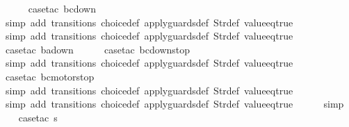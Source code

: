 \begin{isabellebody}
\ \ \ \ \isamarkupfalse%
\ {\isacharparenleft}case{\isacharunderscore}tac\ {\isachardoublequoteopen}bc{\isacharequal}down{}{}{\isachardoublequoteclose}{\isacharparenright}\isanewline
\ \ \ \ \ \isamarkupfalse%
\ {\isacharparenleft}simp\ add{\isacharcolon}\ transitions\ choice{\isacharunderscore}def\ apply{\isacharunderscore}guards{\isacharunderscore}def\ Str{\isacharunderscore}def\ value{\isacharunderscore}eq{\isacharunderscore}true{\isacharparenright}\isanewline
\ \ \isamarkupfalse%
\ {\isacharparenleft}simp\ add{\isacharcolon}\ transitions\ choice{\isacharunderscore}def\ apply{\isacharunderscore}guards{\isacharunderscore}def\ Str{\isacharunderscore}def\ value{\isacharunderscore}eq{\isacharunderscore}true{\isacharparenright}\isanewline
\ \isamarkupfalse%
\ {\isacharparenleft}case{\isacharunderscore}tac\ {\isachardoublequoteopen}ba{\isacharequal}down{}{}{\isachardoublequoteclose}{\isacharparenright}\isanewline
\ \ \ \ \isamarkupfalse%
\ {\isacharparenleft}case{\isacharunderscore}tac\ {\isachardoublequoteopen}bc{\isacharequal}down{}{}stop{\isachardoublequoteclose}{\isacharparenright}\isanewline
\ \ \ \ \ \isamarkupfalse%
\ {\isacharparenleft}simp\ add{\isacharcolon}\ transitions\ choice{\isacharunderscore}def\ apply{\isacharunderscore}guards{\isacharunderscore}def\ Str{\isacharunderscore}def\ value{\isacharunderscore}eq{\isacharunderscore}true{\isacharparenright}\isanewline
\ \ \ \ \isamarkupfalse%
\ {\isacharparenleft}case{\isacharunderscore}tac\ {\isachardoublequoteopen}bc{\isacharequal}motorstop{}{\isachardoublequoteclose}{\isacharparenright}\isanewline
\ \ \ \ \ \isamarkupfalse%
\ {\isacharparenleft}simp\ add{\isacharcolon}\ transitions\ choice{\isacharunderscore}def\ apply{\isacharunderscore}guards{\isacharunderscore}def\ Str{\isacharunderscore}def\ value{\isacharunderscore}eq{\isacharunderscore}true{\isacharparenright}\isanewline
\ \ \ \ \isamarkupfalse%
\ {\isacharparenleft}simp\ add{\isacharcolon}\ transitions\ choice{\isacharunderscore}def\ apply{\isacharunderscore}guards{\isacharunderscore}def\ Str{\isacharunderscore}def\ value{\isacharunderscore}eq{\isacharunderscore}true{\isacharparenright}\isanewline
\ \ \ \ \isamarkupfalse%
\ simp\isanewline
\isanewline
\ \ \isamarkupfalse%
\ {\isacharparenleft}case{\isacharunderscore}tac\ {\isachardoublequoteopen}s{\isasymin}{\isacharbraceleft}{}{\isacharcomma}\ {}{\isacharcomma}\ {}{\isacharcomma}\ {}{\isacharbraceright}{\isachardoublequoteclose}{\isacharparenright}\isanewline

\end{isabellebody}

